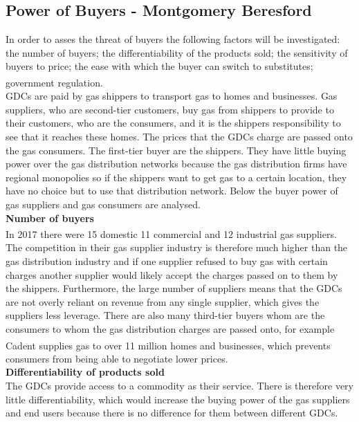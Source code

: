 \documentclass[11pt]{article}		%
\newcommand{\supercite}[1]{\textsuperscript{\cite{#1}}}		%
\begin{document}
		\subsection[Power of Buyers]{Power of Buyers - Montgomery Beresford}
		        In order to asses the threat of buyers the following factors will be investigated: the number of buyers; the differentiability of the products sold; the sensitivity of buyers to price; the ease with which the buyer can switch to substitutes; government regulation.\supercite{Barney}
		        \\
                GDCs are paid by gas shippers to transport gas to homes and businesses. Gas suppliers, who are second-tier customers, buy gas from shippers to provide to their customers, who are the consumers, and it is the shippers responsibility to see that it reaches these homes. The prices that the GDCs charge are passed onto the gas consumers. The first-tier buyer are the shippers. They have little buying power over the gas distribution networks because the gas distribution firms have regional monopolies so if the shippers want to get gas to a certain location, they have no choice but to use that distribution network. Below the buyer power of gas suppliers and gas consumers are analysed.
                \\
                \textbf{Number of buyers}
                \\
                In 2017 there were 15 domestic  11 commercial and 12 industrial  gas suppliers.\supercite{competition_in_gas_supply} The competition in their gas supplier industry is therefore much higher than the gas distribution industry and if one supplier refused to buy gas with certain charges another supplier would likely accept the charges passed on to them by the shippers. Furthermore, the large number of suppliers means that the GDCs are not overly reliant on revenue from any single supplier, which gives the suppliers less leverage. There are also many third-tier buyers whom are the consumers to whom the gas distribution charges are passed onto, for example Cadent supplies gas to over 11 million homes and businesses\supercite{Cadent_Plan}, which prevents consumers from being able to negotiate lower prices.
                \\
                \textbf{Differentiability of products sold}
                \\
                The GDCs provide access to a commodity as their service. There is therefore very little differentiability, which would increase the buying power of the gas suppliers and end users because there is no difference for them between different GDCs.
\end{document}
